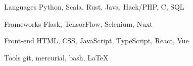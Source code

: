 

\begin{cvskills}


  \cvskill
    {Languages} %
    {Python, Scala, Rust, Java, Hack/PHP, C, SQL} %

  \cvskill
    {Frameworks} %
    {Flask, TensorFlow, Selenium, Nuxt} %

  \cvskill
    {Front-end} %
    {HTML, CSS, JavaScript, TypeScript, React, Vue} %

  \cvskill
    {Tools} %
    {git, mercurial, bash, \LaTeX} %

\end{cvskills}
